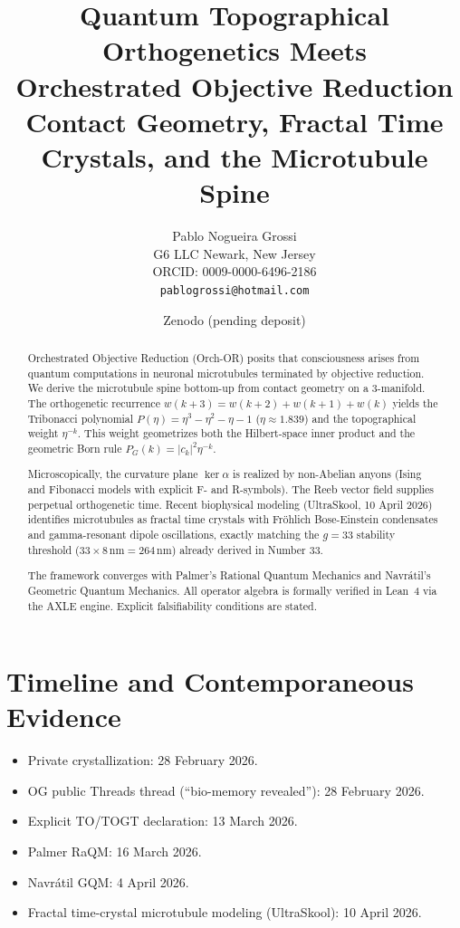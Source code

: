 \documentclass[11pt,a4paper]{article}
\title{\textbf{Quantum Topographical Orthogenetics Meets\\Orchestrated Objective Reduction}\\[6pt]
       \large Contact Geometry, Fractal Time Crystals, and the Microtubule Spine}
\author{Pablo Nogueira Grossi\\[4pt]
        G6 LLC \quad Newark, New Jersey\\
        ORCID: 0009-0000-6496-2186\\
        \texttt{pablogrossi@hotmail.com}}
\date{Zenodo (pending deposit)}
\theoremstyle{definition}
\theoremstyle{remark}
\begin{document}
\maketitle

\begin{abstract}
Orchestrated Objective Reduction (Orch-OR) posits that consciousness arises from quantum
computations in neuronal microtubules terminated by objective reduction. We derive the
microtubule spine bottom-up from contact geometry on a 3-manifold. The orthogenetic
recurrence $w(k+3)=w(k+2)+w(k+1)+w(k)$ yields the Tribonacci polynomial
$P(\eta)=\eta^3-\eta^2-\eta-1$ ($\eta\approx1.839$) and the topographical weight $\eta^{-k}$.
This weight geometrizes both the Hilbert-space inner product and the geometric Born rule
$P_G(k)=|c_k|^2\eta^{-k}$.

Microscopically, the curvature plane $\ker\alpha$ is realized by non-Abelian anyons (Ising
and Fibonacci models with explicit F- and R-symbols). The Reeb vector field supplies
perpetual orthogenetic time. Recent biophysical modeling (UltraSkool, 10 April 2026)
identifies microtubules as fractal time crystals with Fr\"{o}hlich Bose-Einstein condensates
and gamma-resonant dipole oscillations, exactly matching the $g=33$ stability threshold
($33\times8\,\text{nm}=264\,\text{nm}$) already derived in Number 33.

The framework converges with Palmer's Rational Quantum Mechanics and Navr\'{a}til's
Geometric Quantum Mechanics. All operator algebra is formally verified in Lean~4 via the
AXLE engine. Explicit falsifiability conditions are stated.
\end{abstract}

\tableofcontents
\newpage

\section{Timeline and Contemporaneous Evidence}

\begin{itemize}
  \item Private crystallization: 28 February 2026.
  \item OG public Threads thread (``bio-memory revealed''): 28 February 2026.
  \item Explicit TO/TOGT declaration: 13 March 2026.
  \item Palmer RaQM: 16 March 2026.
  \item Navr\'{a}til GQM: 4 April 2026.
  \item Fractal time-crystal microtubule modeling (UltraSkool): 10 April 2026.
\end{itemize}
\end{document}
